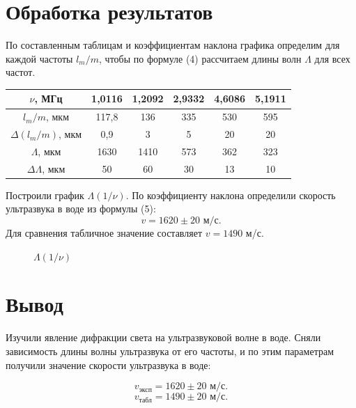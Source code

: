 \documentclass[a4paper, 12pt]{article}%
\begin{document}
	\section{Обработка результатов}
	По составленным таблицам и коэффициентам наклона графика определим для каждой частоты $l_m/m$, чтобы по формуле (4) рассчитаем длины волн $\Lambda$ для всех частот.
	\begin{center}
	    \begin{tabular}{|c|c|c|c|c|c|}
	         \hline
	         $\nu$, МГц & 1,0116 & 1,2092 & 2,9332 & 4{,}6086 & 5{,}1911 \\ \hline
	         $l_m/m$, мкм & 117{,}8 & 136 & 335 & 530 & 595 \\ \hline
	         $\Delta(l_m/m)$, мкм &  0{,}9 & 3 & 5 & 20 & 20 \\ \hline
	         $\Lambda$, мкм & 1630 & 1410 & 573 & 362 & 323 \\ \hline
	         $\Delta\Lambda$, мкм & 50 & 60 & 30 & 13 & 10 \\ \hline
	    \end{tabular}
	\end{center}
	Построили график $\Lambda(1/\nu)$. По коэффициенту наклона определили скорость ультразвука в воде из формулы (5):
	$$v=1620\pm20\text{ м/с}.$$
	Для сравнения табличное значение составляет $v=1490$ м/с.
	\begin{figure}[!htb] \centering
		\caption{$\Lambda(1/\nu)$}
	\end{figure}
    \section{Вывод}
	Изучили явление дифракции света на ультразвуковой волне в воде. Сняли зависимость длины волны ультразвука от его частоты, и по этим параметрам получили значение скорости ультразвука в воде:

\[ v_{\text{эксп}} = 1620\pm20\text{ м/с}. \]
\[ v_{\text{табл}} = 1490\pm20\text{ м/с}. \]
	
\end{document}
